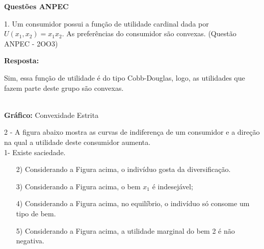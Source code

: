 \begin{flushleft}
\begin{center}
			\end{center}

\singlespacing

\textbf{Questões ANPEC}

1. Um consumidor possui a função de utilidade cardinal dada por $U(x_1,x_2)=x_1 x_2$. As preferências do consumidor são convexas. (Questão ANPEC - 2OO3)
\singlespacing

\textbf{Resposta:}

Sim, essa função de utilidade é do tipo Cobb-Douglas, logo, as utilidades que fazem parte deste grupo são convexas.

\begin{center}

\\
\textbf{Gráfico:} Convexidade Estrita
\end{center}
\singlespacing

2 - A figura abaixo mostra as curvas de indiferença de um consumidor e a direção na qual a utilidade deste
consumidor aumenta.
\\
1- Existe saciedade.
\\
\begin{center}
			\end{center}
			\label{anpect2004_consumidor}
\begin{itemize}

\item[2)] Considerando a Figura acima, o indivíduo gosta da diversificação.
		\item[3)] Considerando a Figura acima, o bem $x_1$ é indesejável;
		\item[4)] Considerando a Figura acima, no equilíbrio, o indivíduo só consome um tipo de bem.
		\item[5)] Considerando a Figura acima, a utilidade marginal do bem 2 é não negativa.
		\end{itemize}


\end{flushleft}
